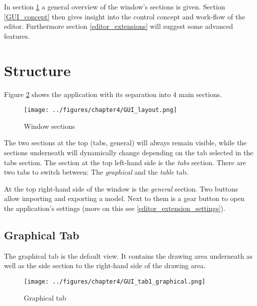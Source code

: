 \documentclass[twoside, openright, 12pt]{book}
\begin{document}
In section \ref{editor_structure} a general overview of the window's sections is given.
Section \ref{GUI_concept} then gives insight into the control concept and work-flow of the editor.
Furthermore section \ref{editor_extensions} will suggest some advanced features.



\section{Structure}
\label{editor_structure}
Figure \ref{fig:GUI_tab1_graphical} shows the application with its separation into 4 main sections.

\begin{figure}[htb]
	\centering
	\texttt{[image: ../figures/chapter4/GUI\_layout.png]}
	\caption{Window sections}
	\label{fig:GUI_layout}
\end{figure}

\noindent
The two sections at the top (tabs, general) will always remain visible, while the sections underneath will dynamically change depending on the tab selected in the tabs section.
The section at the top left-hand side is the \textit{tabs} section.
There are two tabs to switch between: The \textit{graphical} and the \textit{table} tab.

At the top right-hand side of the window is the \textit{general} section.
Two buttons allow importing and exporting a model.
Next to them is a gear button to open the application's settings (more on this see \ref{editor_extension_settings}).



\subsection{Graphical Tab}
\label{editor_graphical}
The graphical tab is the default view.
It contains the drawing area underneath as well as the side section to the right-hand side of the drawing area.

\begin{figure}[htb]
	\centering
	\texttt{[image: ../figures/chapter4/GUI\_tab1\_graphical.png]}
	\caption{Graphical tab}
	\label{fig:GUI_tab1_graphical}
\end{figure}
\end{document}
